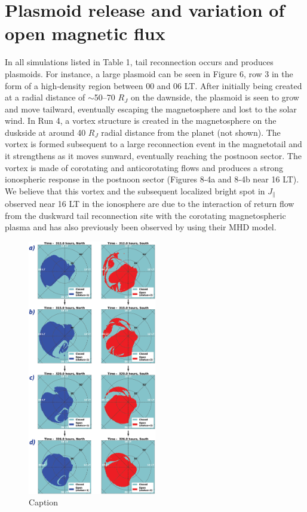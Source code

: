 \section{Plasmoid release and variation of open magnetic flux}

In all simulations listed in Table 1, tail reconnection occurs and produces plasmoids. For instance, a large plasmoid can be seen in Figure 6, row 3 in the form of a high‐density region between 00 and 06 LT. After initially being created at a radial distance of $\sim$50–70 $R_J$ on the dawnside, the plasmoid is seen to grow and move tailward, eventually escaping the magnetosphere and lost to the solar wind. In Run 4, a vortex structure is created in the magnetosphere on the duskside at around 40 $R_J$ radial distance from the planet (not shown). The vortex is formed subsequent to a large reconnection event in the magnetotail and it strengthens as it moves sunward, eventually reaching the postnoon sector. The vortex is made of corotating and anticorotating flows and produces a strong ionospheric response in the postnoon sector (Figures 8‐4a and 8‐4b near 16 LT). We believe that this vortex and the subsequent localized bright spot in $J_\parallel$ observed near 16 LT in the ionosphere are due to the interaction of return flow from the duskward tail reconnection site with the corotating magnetospheric plasma and has also previously been observed by \cite{Fukazawa2006a} using their MHD model. 

\begin{figure}
    \centering
    \includegraphics[width=0.5\textwidth]{images4/open-flux-variation.jpg}
    \caption{Caption}
    \label{fig:open-flux-hemisphere}
\end{figure}


